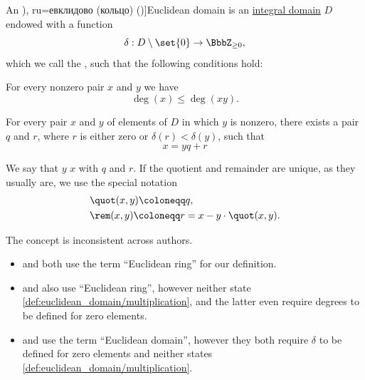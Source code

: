\begin{definition}\label{def:euclidean_domain}
  An \term[bg=евклидов (пръстен) (\cite[def. VI.2]{ГеновМиховскиМоллов1991Алгебра}), ru=евклидово (кольцо) (\cite[def. 3.5.2]{Винберг2014КурсАлгебры})]{Euclidean domain} is an \hyperref[def:integral_domain]{integral domain} \( D \) endowed with a function
  \begin{equation*}
    \delta: D \setminus \set{ 0 } \to \BbbZ_{\geq 0},
  \end{equation*}
  which we call the , such that the following conditions hold:
  \begin{thmenum}
      For every nonzero pair \( x \) and \( y \) we have
    \begin{equation}\label{eq:def:euclidean_domain/multiplication}
      \deg(x) \leq \deg(xy).
    \end{equation}

     For every pair \( x \) and \( y \) of elements of \( D \) in which \( y \) is nonzero, there exists a pair \( q \) and \( r \), where \( r \) is either zero or \( \delta(r) < \delta(y) \), such that
    \begin{equation}\label{eq:def:euclidean_domain/division}
      x = yq + r
    \end{equation}
  \end{thmenum}

  We say that \( y \)  \( x \) with  \( q \) and  \( r \). If the quotient and remainder are unique, as they usually are, we use the special notation
  \begin{align*}
    &\quot(x, y) \coloneqq q, \\
    &\rem(x, y) \coloneqq r = x - y \cdot \quot(x, y).
  \end{align*}
\end{definition}
\begin{comments}
  \item The concept is inconsistent across authors.
  \begin{itemize}
    \item \Textcite[98]{Rotman2015AdvancedModernAlgebraPart1} and \textcite[def. 3.5.2]{Винберг2014КурсАлгебры} both use the term \enquote{Euclidean ring} for our definition.

    \item \Textcite[36]{Шафаревич2019ОсновныеПонятияАлгебры} and \textcite[def. VI.2]{ГеновМиховскиМоллов1991Алгебра} also use \enquote{Euclidean ring}, however neither state \cref{def:euclidean_domain/multiplication}, and the latter even require degrees to be defined for zero elements.

    \item \Textcite[392]{Knapp2016BasicAlgebra} and \textcite[def 2.5]{Jacobson1985BasicAlgebraI} use the term \enquote{Euclidean domain}, however they both require \( \delta \) to be defined for zero elements and neither states \cref{def:euclidean_domain/multiplication}.
  \end{itemize}
\end{comments}

